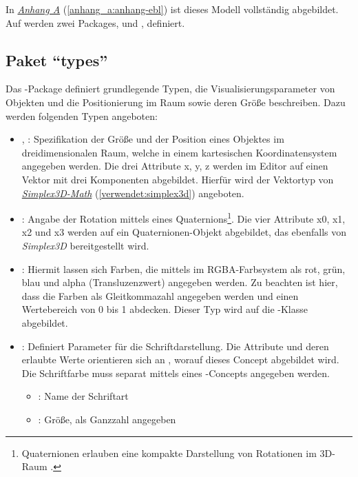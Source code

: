 \documentclass[a4paper,10pt]{sphinxmanual}
\begin{document}
In {\hyperref[anhang_a:anhang-ebl]{\emph{Anhang A}}} (\autoref*{anhang_a:anhang-ebl}) ist dieses Modell vollständig abgebildet.
Auf  werden zwei Packages,  und , definiert.


\subsection{Paket "`types"'}
\label{metamodelle:paket-types}\label{metamodelle:ebl-types}
Das -Package definiert grundlegende Typen, die Visualisierungsparameter von Objekten und die Positionierung im Raum sowie deren Größe beschreiben.
Dazu werden folgenden Typen angeboten:
\begin{itemize}
\item {} 
, : Spezifikation der Größe und der Position eines Objektes im dreidimensionalen Raum, welche in einem kartesischen Koordinatensystem angegeben werden.
Die drei Attribute x, y, z werden im Editor auf einen Vektor mit drei Komponenten abgebildet. Hierfür wird der Vektortyp  von {\hyperref[verwendet:simplex3d]{\emph{Simplex3D-Math}}} (\autoref*{verwendet:simplex3d}) angeboten.

\item {} 
: Angabe der Rotation mittels eines Quaternions\footnote{
Quaternionen erlauben eine kompakte Darstellung von Rotationen im 3D-Raum \cite{www:quat}.
}. Die vier Attribute x0, x1, x2 und x3 werden auf ein Quaternionen-Objekt   abgebildet, das ebenfalls von \emph{Simplex3D} bereitgestellt wird.

\item {} 
: Hiermit lassen sich Farben, die mittels im RGBA-Farbsystem als rot, grün, blau und alpha (Transluzenzwert) angegeben werden.
Zu beachten ist hier, dass die Farben als Gleitkommazahl angegeben werden und einen Wertebereich von 0 bis 1 abdecken.
Dieser Typ wird auf die -Klasse abgebildet.

\item {} 
: Definiert Parameter für die Schriftdarstellung. Die Attribute und deren erlaubte Werte orientieren sich an , worauf dieses Concept abgebildet wird.
Die Schriftfarbe muss separat mittels eines -Concepts angegeben werden.
\begin{itemize}
\item {} 
: Name der Schriftart

\item {} 
: Größe, als Ganzzahl angegeben


\end{itemize}
\end{itemize}
\end{document}
